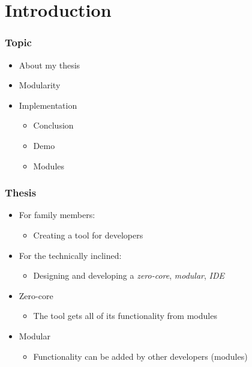 \section{Introduction}
\SectionPage

\begin{frame}
  \frametitle{Topic}
  \begin{itemize}
    \item About my thesis
    \item Modularity
    \item Implementation
    \begin{itemize}
      \item Conclusion
      \item Demo
      \item Modules
    \end{itemize}
  \end{itemize}
\end{frame}

\begin{frame}
  \frametitle{Thesis}
  \begin{itemize}
    \item For family members:
      \begin{itemize}
        \item Creating a tool for developers
      \end{itemize}
    \item For the technically inclined:
    \begin{itemize}
      \item Designing and developing a \textit{zero-core}, \textit{modular}, \textit{IDE}
    \end{itemize}
    \item Zero-core
      \begin{itemize}
        \item The tool gets all of its functionality from modules
      \end{itemize}
    \item Modular
      \begin{itemize}
        \item Functionality can be added by other developers (modules)
      \end{itemize}
  \end{itemize}
\end{frame}

